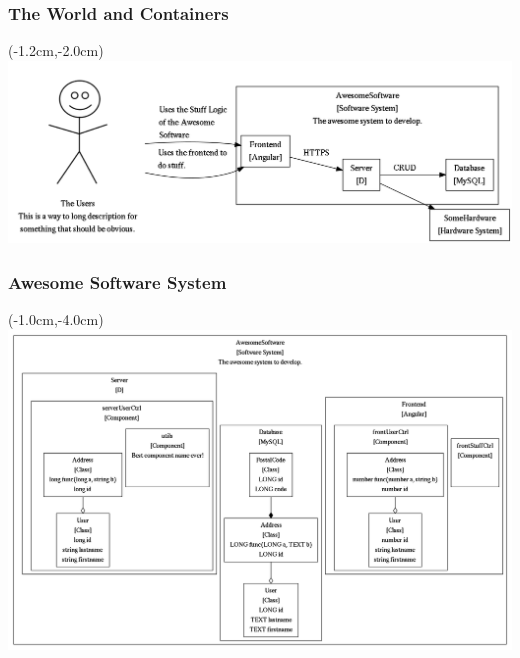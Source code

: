 \documentclass[xelatex,13pt]{beamer}
\begin{document}
\begin{frame}
	\frametitle{The World and Containers}
	\begin{textblock*}{0cm}(-1.2cm,-2.0cm)
		\includegraphics[width=1.0\paperwidth]{theworldandcontainer.png}
	\end{textblock*}
\end{frame}


\begin{frame}
	\frametitle{Awesome Software System}
	\begin{textblock*}{0cm}(-1.0cm,-4.0cm)
		\includegraphics[width=1.0\paperwidth]{AwesomeSoftware.png}
	\end{textblock*}
\end{frame}
\end{document}
